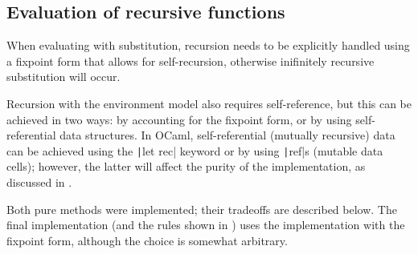 \subsection{Evaluation of recursive functions}
\label{sec:rec_impl}

When evaluating with substitution, recursion needs to be explicitly handled using a fixpoint form that allows for self-recursion, otherwise inifinitely recursive substitution will occur.

Recursion with the environment model also requires self-reference, but this can be achieved in two ways: by accounting for the fixpoint form, or by using self-referential data structures. In OCaml, self-referential (mutually recursive) data can be achieved using the \texttt|let rec| keyword or by using \texttt|ref|s (mutable data cells); however, the latter will affect the purity of the implementation, as discussed in .

Both pure methods were implemented; their tradeoffs are described below. The final implementation (and the rules shown in ) uses the implementation with the fixpoint form, although the choice is somewhat arbitrary.

